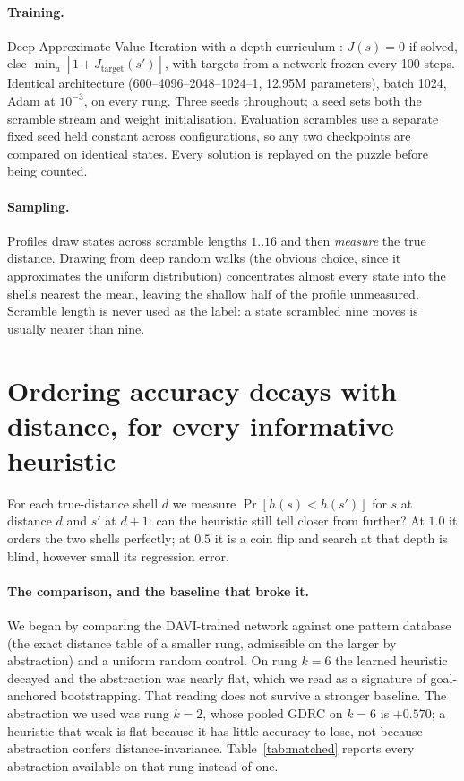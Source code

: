 \documentclass{article}
\begin{document}
\paragraph{Training.} Deep Approximate Value Iteration \citep{agostinelli2019}
with a depth curriculum \citep{arfaee2011}: $J(s)=0$ if solved, else
$\min_a [1 + J_{\text{target}}(s')]$, with targets from a network frozen every 100
steps. Identical architecture (600--4096--2048--1024--1, 12.95M parameters),
batch 1024, Adam at $10^{-3}$, on every rung. Three seeds throughout; a seed sets
both the scramble stream and weight initialisation. Evaluation scrambles use a
separate fixed seed held constant across configurations, so any two checkpoints
are compared on identical states. Every solution is replayed on the puzzle before
being counted.

\paragraph{Sampling.} Profiles draw states across scramble lengths $1..16$ and
then \emph{measure} the true distance. Drawing from deep random walks (the
obvious choice, since it approximates the uniform distribution) concentrates
almost every state into the shells nearest the mean, leaving the shallow half of
the profile unmeasured. Scramble length is never used as the label: a state
scrambled nine moves is usually nearer than nine.

\section{Ordering accuracy decays with distance, for every informative
heuristic}
\label{sec:profile}

For each true-distance shell $d$ we measure
$\Pr[h(s) < h(s')]$ for $s$ at distance $d$ and $s'$ at $d+1$: can the heuristic
still tell closer from further? At $1.0$ it orders the two shells perfectly; at
$0.5$ it is a coin flip and search at that depth is blind, however small its
regression error.

\paragraph{The comparison, and the baseline that broke it.} We began by comparing
the DAVI-trained network against one pattern database (the exact distance
table of a smaller rung, admissible on the larger by abstraction) and a
uniform random control. On rung $k=6$ the learned heuristic decayed and the
abstraction was nearly flat, which we read as a signature of goal-anchored
bootstrapping. That reading does not survive a stronger baseline. The abstraction
we used was rung $k=2$, whose pooled GDRC on $k=6$ is $+0.570$; a heuristic that
weak is flat because it has little accuracy to lose, not because abstraction
confers distance-invariance. Table~\ref{tab:matched} reports every abstraction
available on that rung instead of one.
\end{document}
